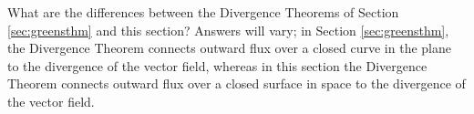{What are the differences between the Divergence Theorems of Section \ref{sec:greensthm} and this section?
}
{Answers will vary; in Section \ref{sec:greensthm}, the Divergence Theorem connects outward flux over a closed curve in the plane to the divergence of the vector field, whereas in this section the Divergence Theorem connects outward flux over a closed surface in space to the divergence of the vector field.
}

